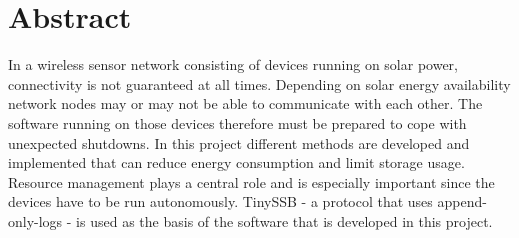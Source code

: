 \chapter{Abstract}

In a wireless sensor network consisting of devices running on solar power, connectivity is not guaranteed at all times. Depending on solar energy availability network nodes may or may not be able to communicate with each other. The software running on those devices therefore must be prepared to cope with unexpected shutdowns. In this project different methods are developed and implemented that can reduce energy consumption and limit storage usage. Resource management plays a central role and is especially important since the devices have to be run autonomously. TinySSB - a protocol that uses append-only-logs - is used as the basis of the software that is developed in this project.